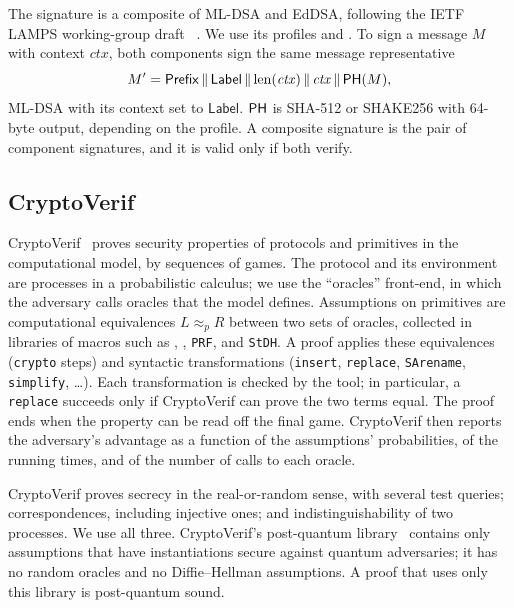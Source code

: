 \begin{sloppypar}
The signature is a composite of ML-DSA and EdDSA, following the IETF LAMPS
working-group draft ~\cite{Composite}.
We use its profiles  and
. To sign a message $M$ with context
$\mathit{ctx}$, both components sign the same message representative
\[
  M' = \mathsf{Prefix} \,\|\, \mathsf{Label} \,\|\, \mathrm{len}(\mathit{ctx}) \,\|\, \mathit{ctx} \,\|\, \mathsf{PH}(M),
\]
ML-DSA with its context set to $\mathsf{Label}$. $\mathsf{PH}$ is SHA-512 or
SHAKE256 with 64-byte output, depending on the profile. A composite
signature is the pair of component signatures, and it is valid only if both
verify.
\end{sloppypar}

\subsection{CryptoVerif}\label{sec:cv}

CryptoVerif~\cite{Bla08,CryptoVerif} proves security properties of protocols
and primitives in the computational model, by sequences of games. The
protocol and its environment are processes in a probabilistic calculus; we
use the ``oracles'' front-end, in which the adversary calls oracles that the
model defines. Assumptions on primitives are computational equivalences
$L \approx_p R$ between two sets of oracles, collected in libraries of macros
such as , ,
\texttt{PRF},  and \texttt{StDH}. A proof applies
these equivalences (\texttt{crypto} steps) and syntactic transformations
(\texttt{insert}, \texttt{replace}, \texttt{SArename}, \texttt{simplify},
\ldots). Each transformation is checked by the tool; in particular, a
\texttt{replace} succeeds only if CryptoVerif can prove the two terms equal.
The proof ends when the property can be read off the final game. CryptoVerif
then reports the adversary's advantage as a function of the assumptions'
probabilities, of the running times, and of the number of calls to each
oracle.

CryptoVerif proves secrecy in the real-or-random sense, with several test
queries; correspondences, including injective ones; and indistinguishability
of two processes. We use all three. CryptoVerif's post-quantum
library~\cite{BJ24} contains only assumptions that have instantiations secure
against quantum adversaries; it has no random oracles and no
Diffie--Hellman assumptions. A proof that uses only this library is
post-quantum sound.
